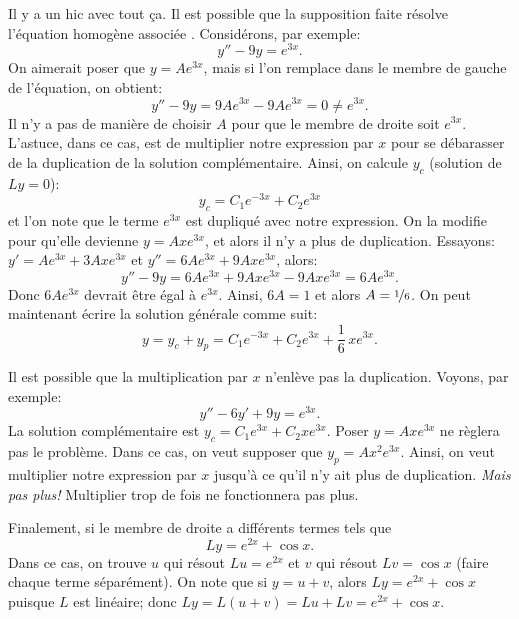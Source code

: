 \medskip

Il y a un hic avec tout ça. Il est possible que la supposition faite résolve l'équation homogène associée .  Considérons, par exemple: 
\begin{equation*}
y'' - 9y = e^{3x} .
\end{equation*}
On aimerait poser que  $y = Ae^{3x}$, mais si l'on remplace dans le membre de gauche de l'équation, on obtient:  
\begin{equation*}
y''-9y = 9Ae^{3x} - 9Ae^{3x} = 0 \not= e^{3x} .
\end{equation*}
Il n'y a pas de manière de choisir $A$ pour que le membre de droite soit $e^{3x}$.
L'astuce, dans ce cas, est de multiplier notre expression par  $x$ pour se débarasser de la duplication de la solution complémentaire. Ainsi, on calcule  $y_c$ (solution de $Ly =
0$): 
\begin{equation*}
y_c = C_1 e^{-3x} + C_2 e^{3x} 
\end{equation*}
et l'on note que le terme $e^{3x}$ est dupliqué avec notre expression. On la modifie pour qu'elle devienne  $y = Axe^{3x}$, et alors il n'y a plus de duplication. Essayons: 
$y' = Ae^{3x} + 3Axe^{3x}$ et 
$y'' = 6Ae^{3x} + 9Axe^{3x}$, alors: 
\begin{equation*}
y'' -9y = 6Ae^{3x} + 9Axe^{3x} - 9Axe^{3x} = 
6Ae^{3x} .
\end{equation*}
Donc $6Ae^{3x}$ devrait être égal à $e^{3x}$.  Ainsi,
$6A = 1$ et alors $A=\nicefrac{1}{6}$.  On peut maintenant écrire la solution générale comme suit: 
\begin{equation*}
y = y_c + y_p = 
C_1 e^{-3x} + C_2 e^{3x} + \frac{1}{6}\,xe^{3x} .
\end{equation*}

\medskip

Il est possible que la multiplication  par $x$ n'enlève pas la
duplication.  Voyons, par exemple: 
\begin{equation*}
y''-6y'+9y = e^{3x} .
\end{equation*}
La solution complémentaire est
$y_c = C_1 e^{3x} + C_2 x e^{3x}$.  Poser $y=A xe^{3x}$
ne règlera pas le problème.  Dans ce cas, on veut supposer que 
$y_p = Ax^2e^{3x}$. Ainsi, on veut multiplier notre expression par  $x$
jusqu'à ce qu'il n'y ait plus de duplication. \emph{Mais pas plus!}  Multiplier trop de fois ne fonctionnera pas plus. 


\medskip

Finalement, si le membre de droite a différents termes tels que 
\begin{equation*}
Ly = e^{2x} + \cos x .
\end{equation*}
Dans ce cas, on trouve  $u$ qui résout $Lu = e^{2x}$ et $v$ qui résout $Lv = \cos x$ (faire chaque terme séparément).  On note que si $y = u+ v$, alors $Ly = e^{2x} + \cos x$ puisque 
$L$ est linéaire; donc 
$Ly = L(u+v) = Lu + Lv = e^{2x} + \cos x$.

